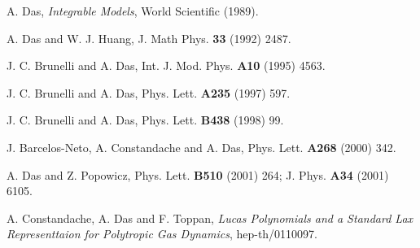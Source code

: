 \documentclass[a4paper,11pt]{article}
\begin{document}
\begin{thebibliography}{99}

 A. Das, {\em Integrable Models}, World Scientific (1989).

 A. Das and W. J. Huang, J. Math Phys. {\bf 33} (1992)
2487.

 J. C. Brunelli and A. Das, Int. J. Mod. Phys. {\bf A10}
(1995) 4563.

 J. C. Brunelli and A. Das, Phys. Lett. {\bf A235} (1997)
597.

 J. C. Brunelli and A. Das, Phys. Lett. {\bf B438} (1998)
99.

 J. Barcelos-Neto, A. Constandache and A. Das,
Phys. Lett. {\bf A268} (2000) 342.

 A. Das and Z. Popowicz, Phys. Lett. {\bf B510} (2001) 264;
J. Phys. {\bf A34} (2001) 6105.

 A. Constandache, A. Das and F. Toppan, {\em Lucas
Polynomials and a Standard Lax Representtaion for Polytropic Gas
Dynamics},  hep-th/0110097.

\end{thebibliography}
\end{document}
